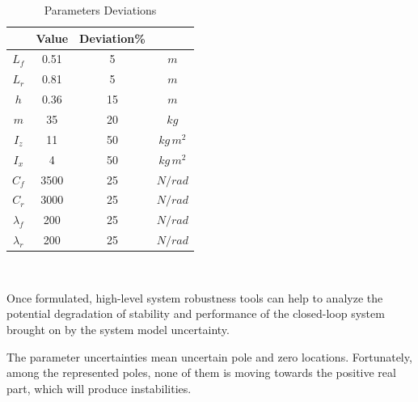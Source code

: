\begin{table}
	\centering
	\begin{tabular}{c|cc|c}
	 & \textbf{Value} & \textbf{Deviation\%} &      \\ \hline
	$L_{f}$       & 0.51          & 5         & $m$       \\
	$L_{r}$       & 0.81          & 5         & $m$       \\
	$h$           & 0.36          & 15        & $m$       \\
	$m$           & 35            & 20        & $kg$      \\
	$I_{z}$       & 11            & 50        & $kg\,m^2$ \\
	$I_{x}$       & 4             & 50        & $kg\,m^2$ \\
	$C_{f}$       & 3500          & 25        & $N/rad$   \\
	$C_{r}$       & 3000          & 25        & $N/rad$   \\
	$\lambda_{f}$ & 200           & 25        & $N/rad$   \\
	$\lambda_{r}$ & 200           & 25        & $N/rad$   \\ \hline 
	\end{tabular}
	\caption{Parameters Deviations}
	\\[6pt]
\end{table}

Once formulated, high-level system robustness tools can help to analyze the potential degradation of stability and performance of the closed-loop system brought on by the system model uncertainty.

The parameter uncertainties mean uncertain pole and zero locations. Fortunately, among the represented poles, none of them is moving towards the positive real part, which will produce instabilities.

